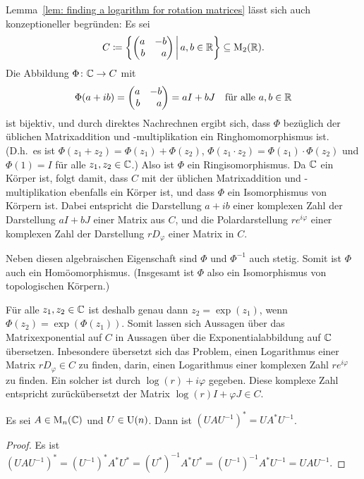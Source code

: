 \documentclass[a4paper, 10pt, numbers=noenddot]{scrartcl}
\begin{document}
\begin{remark}
  Lemma~\ref{lem: finding a logarithm for rotation matrices} lässt sich auch konzeptioneller begründen:
  Es sei
  \[
    C \coloneqq
    \left\{
      \begin{pmatrix*}[r]
        a & -b  \\
        b &  a
      \end{pmatrix*}
    \,\middle|\,
      a, b \in \Rbb
    \right\}
    \subseteq
    \Mat_2(\Rbb).
  \]
  Die Abbildung $\Phi \colon \mathbb{C} \to C$ mit
  \[
    \Phi(a + i b)
    =
    \begin{pmatrix*}[r]
      a & -b  \\
      b &  a
    \end{pmatrix*}
    =
    a I + b J
    \quad
    \text{für alle $a, b \in \Rbb$}
  \]
  ist bijektiv, und durch direktes Nachrechnen ergibt sich, dass $\Phi$ bezüglich der üblichen Matrixaddition und -multiplikation ein Ringhomomorphismus ist. (D.h.\ es ist $\Phi(z_1 + z_2) = \Phi(z_1) + \Phi(z_2)$, $\Phi(z_1 \cdot z_2) = \Phi(z_1) \cdot \Phi(z_2)$ und $\Phi(1) = I$ für alle $z_1, z_2 \in \mathbb{C}$.)
  Also ist $\Phi$ ein Ringisomorphismus.
  Da $\mathbb{C}$ ein Körper ist, folgt damit, dass $C$ mit der üblichen Matrixaddition und -multiplikation ebenfalls ein Körper ist, und dass $\Phi$ ein Isomorphismus von Körpern ist.
  Dabei entspricht die Darstellung $a + ib$ einer komplexen Zahl der Darstellung $a I + b J$ einer Matrix aus $C$, und die Polardarstellung $r e^{i\varphi}$ einer komplexen Zahl der Darstellung $r D_\varphi$ einer Matrix in $C$.
  
  Neben diesen algebraischen Eigenschaft sind $\Phi$ und $\Phi^{-1}$ auch stetig.
  Somit ist $\Phi$ auch ein Homöomorphismus.
  (Insgesamt ist $\Phi$ also ein Isomorphismus von topologischen Körpern.)
  
  Für alle $z_1, z_2 \in \mathbb{C}$ ist deshalb genau dann $z_2 = \exp(z_1)$, wenn $\Phi(z_2) = \exp(\Phi(z_1))$.
  Somit lassen sich Aussagen über das Matrixexponential auf $C$ in Aussagen über die Exponentialabbildung auf $\mathbb{C}$ übersetzen.
  Inbesondere übersetzt sich das Problem, einen Logarithmus einer Matrix $r D_\varphi \in C$ zu finden, darin, einen Logarithmus einer komplexen Zahl $r e^{i \varphi}$ zu finden.
  Ein solcher ist durch $\log(r) + i \varphi$ gegeben.
  Diese komplexe Zahl entspricht zurückübersetzt der Matrix $\log(r) I + \varphi J \in C$.
\end{remark}


\begin{lemma}\label{lemma: unitary basis change matrices}
  Es sei $A \in \operatorname{M}_n(\mathbb{C})$ und $U \in \operatorname{U}(n)$.
  Dann ist $(U \! A U^{-1})^* = U \! A^* U^{-1}$.
\end{lemma}
\begin{proof}
  Es ist
  $
      (U \! A U^{-1})^*
    = (U^{-1})^* A^* U^*
    = (U^*)^{-1} A^* U^*
    = (U^{-1})^{-1} A^* U^{-1}
    = U \! A U^{-1}.
  $
\end{proof}
\end{document}
